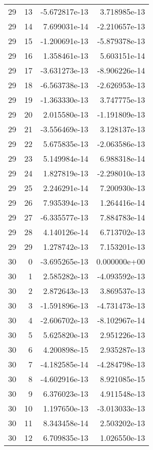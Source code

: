 \begin{tabular}{rrrr}
  29 &   13 & -5.672817e-13 &  3.718985e-13 \\
  29 &   14 &  7.699031e-14 & -2.210657e-13 \\
  29 &   15 & -1.200691e-13 & -5.879378e-13 \\
  29 &   16 &  1.358461e-13 &  5.603151e-14 \\
  29 &   17 & -3.631273e-13 & -8.906226e-14 \\
  29 &   18 & -6.563738e-13 & -2.626953e-13 \\
  29 &   19 & -1.363330e-13 &  3.747775e-13 \\
  29 &   20 &  2.015580e-13 & -1.191809e-13 \\
  29 &   21 & -3.556469e-13 &  3.128137e-13 \\
  29 &   22 &  5.675835e-13 & -2.063586e-13 \\
  29 &   23 &  5.149984e-14 &  6.988318e-14 \\
  29 &   24 &  1.827819e-13 & -2.298010e-13 \\
  29 &   25 &  2.246291e-14 &  7.200930e-13 \\
  29 &   26 &  7.935394e-13 &  1.264416e-14 \\
  29 &   27 & -6.335577e-13 &  7.884783e-14 \\
  29 &   28 &  4.140126e-14 &  6.713702e-13 \\
  29 &   29 &  1.278742e-13 &  7.153201e-13 \\
  30 &    0 & -3.695265e-13 &  0.000000e+00 \\
  30 &    1 &  2.585282e-13 & -4.093592e-13 \\
  30 &    2 &  2.872643e-13 &  3.869537e-13 \\
  30 &    3 & -1.591896e-13 & -4.731473e-13 \\
  30 &    4 & -2.606702e-13 & -8.102967e-14 \\
  30 &    5 &  5.625820e-13 &  2.951226e-13 \\
  30 &    6 &  4.200898e-15 &  2.935287e-13 \\
  30 &    7 & -4.182585e-14 & -4.284798e-13 \\
  30 &    8 & -4.602916e-13 &  8.921085e-15 \\
  30 &    9 &  6.376023e-13 &  4.911548e-13 \\
  30 &   10 &  1.197650e-13 & -3.013033e-13 \\
  30 &   11 &  8.343458e-14 &  2.503202e-13 \\
  30 &   12 &  6.709835e-13 &  1.026550e-13 \\

\end{tabular}
